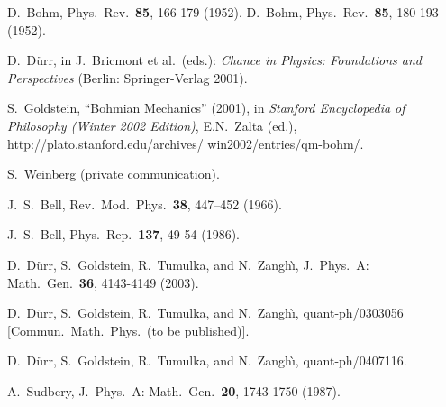 \documentclass[12pt, showpacs, nofootinbib,superscriptaddress]{revtex4-2}%
\begin{document}
\begin{thebibliography}{28.}
\raggedright

 D.~Bohm,
   Phys.\ Rev.\ \textbf{85}, 166-179 (1952).  D.~Bohm,
   Phys.\ Rev.\ \textbf{85}, 180-193 (1952).

 D.~D\"urr, %
   in J.~Bricmont et
   al.\ (eds.): \textit{Chance in Physics: Foundations and
   Perspectives}  (Berlin: Springer-Verlag 2001).

 S.~Goldstein, ``Bohmian Mechanics'' (2001), in
   \textit{Stanford Encyclopedia of Philosophy (Winter 2002 Edition)},
   E.N.~Zalta (ed.),
   http://plato.stanford.edu/archives/ win2002/entries/qm-bohm/.

 S.~Weinberg (private communication).

 J.~S.~Bell,
    Rev.\ Mod.\ Phys.\ \textbf{38}, 447--452 (1966).

 J.~S.~Bell,
   Phys.\ Rep.\ \textbf{137}, 49-54 (1986).

 D.~D\"urr, S.~Goldstein, R.~Tumulka, and N.~Zangh{\`\i},
   J.\ Phys.\ A: Math.\ Gen.\ \textbf{36},
   4143-4149 (2003). %

 D.~D\"urr, S.~Goldstein, R.~Tumulka, and
   N.~Zangh{\`\i}, %
   quant-ph/0303056 [Commun.\ Math.\ Phys.\ (to be published)].

 D.~D\"urr, S.~Goldstein, R.~Tumulka, and
   N.~Zangh{\`\i}, %
   quant-ph/0407116.

 A.~Sudbery, %
   J.\ Phys.\ A: Math.\ Gen.\ \textbf{20}, 1743-1750 (1987).


\end{thebibliography}
\end{document}
